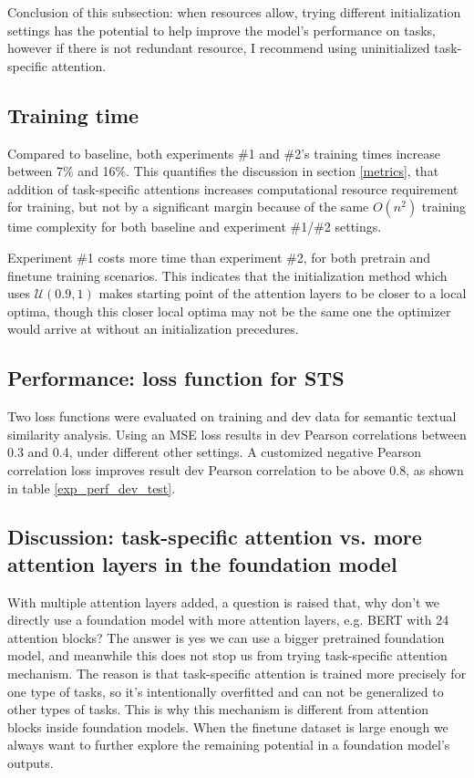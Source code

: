 \documentclass{article}
\begin{document}
Conclusion of this subsection: when resources allow, trying different initialization settings has the potential to help improve the model's performance on tasks, however if there is not redundant resource, I recommend using uninitialized task-specific attention.

\subsection{Training time}
\label{training_time}
Compared to baseline, both experiments \#1 and \#2's training times increase between 7\% and 16\%. This quantifies the discussion in section \ref{metrics}, that addition of task-specific attentions increases computational resource requirement for training, but not by a significant margin because of the same $O(n^2)$ training time complexity for both baseline and experiment \#1/\#2 settings. 

Experiment \#1 costs more time than experiment \#2, for both pretrain and finetune training scenarios. This indicates that the initialization method which uses $\mathcal{U}(0.9, 1)$ makes starting point of the attention layers to be closer to a local optima, though this closer local optima may not be the same one the optimizer would arrive at without an initialization precedures.




\subsection{Performance: loss function for STS}
\label{sts_loss}

Two loss functions were evaluated on training and dev data for semantic textual similarity analysis. Using an MSE loss results in dev Pearson correlations between 0.3 and 0.4, under different other settings. A customized negative Pearson correlation loss improves result dev Pearson correlation to be above 0.8, as shown in table \ref{exp_perf_dev_test}. 

\subsection{Discussion: task-specific attention vs. more attention layers in the foundation model}
\label{task_vs_foundation}

With multiple attention layers added, a question is raised that, why don't we directly use a foundation model with more attention layers, e.g. BERT with 24 attention blocks? The answer is yes we can use a bigger pretrained foundation model, and meanwhile this does not stop us from trying task-specific attention mechanism. The reason is that task-specific attention is trained more precisely for one type of tasks, so it's intentionally overfitted and can not be generalized to other types of tasks. This is why this mechanism is different from attention blocks inside foundation models. When the finetune dataset is large enough we always want to further explore the remaining potential in a foundation model's outputs. 
\end{document}
